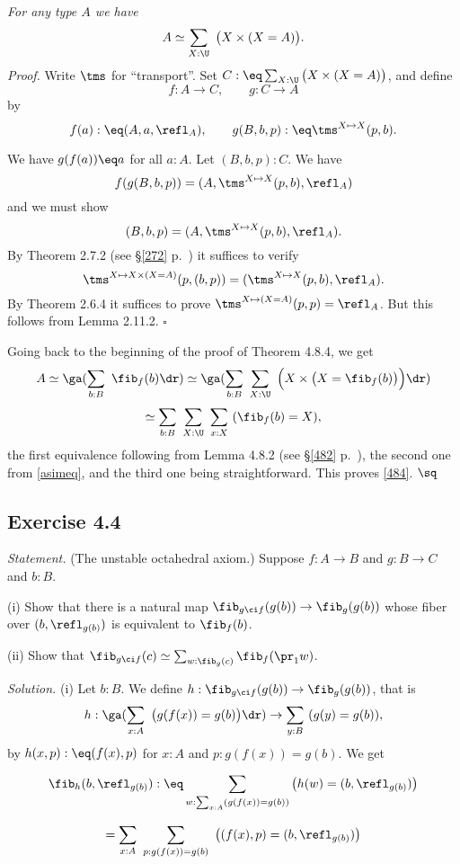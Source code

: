 \documentclass[12pt]{article}
\begin{document}
\nn{} \emph{For any type $A$ we have} 
\begin{equation}\label{asimeq}
A\simeq\sum_{X:\U}\ \big(X\times(X=A)\big).
\end{equation}
\emph{Proof.} Write $\tms$ for ``transport''. Set $C:\eq\sum_{X:\U}\big(X\times(X=A)\big)$, and define 
$$
f:A\to C,\qquad g:C\to A
$$ 
by 
$$
f(a):\eq(A,a,\refl_A),\qquad g(B,b,p):\eq\tms^{X\mapsto X}(p,b).
$$ 

\nn We have $g(f(a))\eq a$ for all $a:A$. Let $(B,b,p):C$. We have 
$$
f(g(B,b,p))=(A,\tms^{X\mapsto X}(p,b),\refl_A)
$$ 
and we must show 
$$
(B,b,p)=(A,\tms^{X\mapsto X}(p,b),\refl_A).
$$
By Theorem 2.7.2 (see \S\ref{272} p.~\pageref{272}) it suffices to verify 
$$
\tms^{X\mapsto X\times(X=A)}(p,(b,p))=(\tms^{X\mapsto X}(p,b),\refl_A).
$$ 
By Theorem 2.6.4 it suffices to prove $\tms^{X\mapsto(X=A)}(p,p)=\refl_A$. But this follows from Lemma 2.11.2. $\square$

Going back to the beginning of the proof of Theorem 4.8.4, we get 
$$
A\simeq\ga(\sum_{b:B}\ \fib_f(b)\dr)\simeq\ga(\sum_{b:B}\ \sum_{X:\U}\ \Big(X\times\big(X=\fib_f(b)\big)\Big)\dr)
$$
$$
\simeq\sum_{b:B}\ \sum_{X:\U}\ \sum_{x:X}\ (\fib_f(b)=X),
$$ 
the first equivalence following from Lemma 4.8.2 (see \S\ref{482} p.~\pageref{482}), the second one from \eqref{asimeq}, and the third one being straightforward. This proves \eqref{484}. $\sq$


\subsection{Exercise 4.4}

\emph{Statement.} (The unstable octahedral axiom.) Suppose $f:A\to B$ and $g:B\to C$ and $b:B$.

\nn(i) Show that there is a natural map $\fib_{g\ci f}(g(b))\to\fib_g(g(b))$ whose fiber over $(b, \refl_{g(b)})$ is equivalent to $\fib_f(b)$.

\nn(ii) Show that $\fib_{g\ci f}(c)\simeq\sum_{w:\fib_g(c)}\fib_f(\pr_1w)$.

\nn\emph{Solution.} (i) Let $b:B$. We define $h:\fib_{g\ci f}(g(b))\to\fib_g(g(b))$, that is
$$
h:\ga(\sum_{x:A}\ \big(g(f(x))=g(b)\big)\dr)\to\sum_{y:B}\ (g(y)=g(b)),
$$ 
by $h(x,p):\eq(f(x),p)$ for $x:A$ and $p:g(f(x))=g(b)$. We get 

$$\fib_h(b,\refl_{g(b)}):\eq\sum_{w:\sum_{x:A}(g(f(x))=g(b))}\big(h(w)=(b,\refl_{g(b)})\big)$$ 

$$=\sum_{x:A}\ \sum_{p:g(f(x))=g(b)}\ \big((f(x),p)=(b,\refl_{g(b)})\big)$$ 
\end{document}
